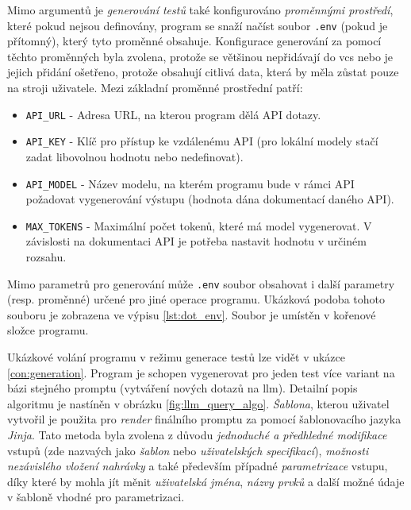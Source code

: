 \documentclass[czech, ma, kiv, he, iso690alph, pdf, viewonly]{fasthesis}
\begin{document}
        Mimo argumentů je \textit{generování testů} také konfigurováno \textit{proměnnými prostředí}, které pokud nejsou definovány, program se snaží načíst soubor \verb|.env| (pokud je přítomný), který tyto proměnné obsahuje. Konfigurace generování za pomocí těchto proměnných byla zvolena, protože se většinou nepřidávají do \Acrshort{vcs} nebo je jejich přidání ošetřeno, protože obsahují citlivá data, která by měla zůstat pouze na stroji uživatele. Mezi základní proměnné prostřední patří:
        \begin{itemize}
            \item \verb|API_URL| - Adresa URL, na kterou program dělá API dotazy.
            \item \verb|API_KEY| - Klíč pro přístup ke vzdálenému API (pro lokální modely stačí zadat libovolnou hodnotu nebo nedefinovat).
            \item \verb|API_MODEL| - Název modelu, na kterém programu bude v rámci API požadovat vygenerování výstupu (hodnota dána dokumentací daného API).
            \item \verb|MAX_TOKENS| - Maximální počet tokenů, které má model vygenerovat. V závislosti na dokumentaci API je potřeba nastavit hodnotu v určiném rozsahu.
        \end{itemize}
        Mimo parametrů pro generování může \verb|.env| soubor obsahovat i další parametry (resp. proměnné) určené pro jiné operace programu. Ukázková podoba tohoto souboru je zobrazena ve výpisu \ref{lst:dot_env}. Soubor je umístěn v kořenové složce programu.

        Ukázkové volání programu v režimu generace testů lze vidět v ukázce \ref{con:generation}. Program je schopen vygenerovat pro jeden test více variant na bázi stejného promptu (vytváření nových dotazů na \Gls{llm}). Detailní popis algoritmu je nastíněn v obrázku \ref{fig:llm_query_algo}. \textit{Šablona}, kterou uživatel vytvořil je použita pro \emph{render} finálního promptu za pomocí šablonovacího jazyka \textit{Jinja}. Tato metoda byla zvolena z důvodu \textit{jednoduché a předhledné modifikace} vstupů (zde nazvaých jako \textit{šablon} nebo \textit{uživatelských specifikací}), \textit{možnosti nezávislého vložení nahrávky} a také především případné \textit{parametrizace} vstupu, díky které by mohla jít měnit \textit{uživatelská jména}, \textit{názvy prvků} a další možné údaje v šabloně vhodné pro parametrizaci. 
\end{document}
